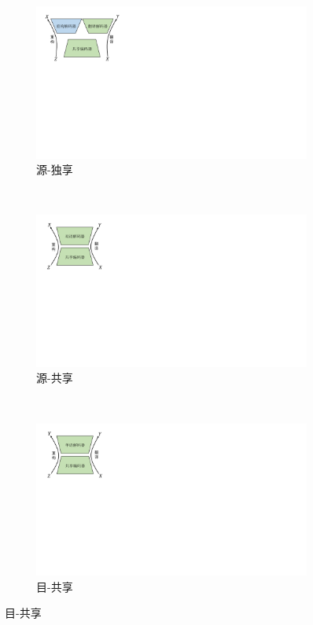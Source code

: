 
\begin{figure}[!htbp]
    \centering
    \begin{subfigure}[b]{0.5\textwidth}
      \centering
      \includegraphics[scale=0.7]{Img/fig_3_sr.pdf}
      \caption{源-独享}
      \label{fig:3_sr}
    \end{subfigure}%
    ~%
    \begin{subfigure}[b]{0.5\textwidth}
      \centering
      \includegraphics[scale=0.7]{Img/fig_3_ss.pdf}
      \caption{源-共享}
      \label{fig:3_ss}
    \end{subfigure}
    \\%
    \begin{subfigure}[b]{0.5\textwidth}
      \centering
      \includegraphics[scale=0.7]{Img/fig_3_t.pdf}
      \caption{目-共享}
      \label{fig:3_t}
    \end{subfigure}%
    \label{fig:4_fidelity}
\end{figure}
